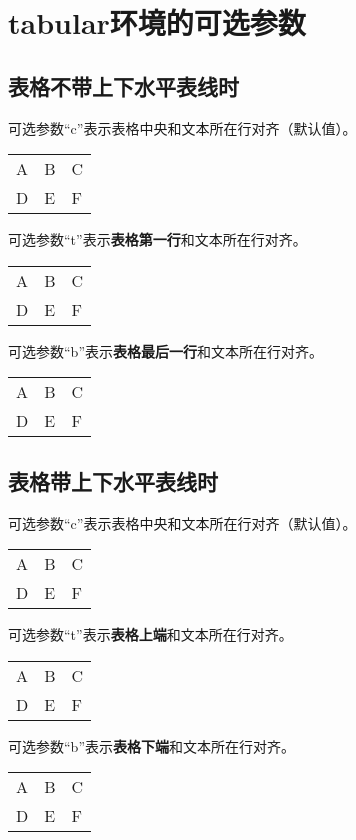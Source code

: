 ﻿\documentclass{article}
\begin{document}
    \mbox{}

\section{tabular环境的可选参数} 
\subsection{表格不带上下水平表线时}
    可选参数``c''表示表格中央和文本所在行对齐（默认值）。
    \begin{tabular}[c]{lll}
        A&B&C\\
        D&E&F\\
    \end{tabular}

    \mbox{}

    可选参数``t''表示\textbf{表格第一行}和文本所在行对齐。
    \begin{tabular}[t]{lll}
        A&B&C\\
        D&E&F\\
    \end{tabular}

    \mbox{}

    可选参数``b''表示\textbf{表格最后一行}和文本所在行对齐。
    \begin{tabular}[b]{lll}
        A&B&C\\
        D&E&F\\
    \end{tabular}
    
\subsection{表格带上下水平表线时}
可选参数``c''表示表格中央和文本所在行对齐（默认值）。
    \begin{tabular}[c]{lll}
        \hline
        A&B&C\\
        D&E&F\\
        \hline
    \end{tabular}

    \mbox{}

    可选参数``t''表示\textbf{表格上端}和文本所在行对齐。
    \begin{tabular}[t]{lll}
        \hline
        A&B&C\\
        D&E&F\\
        \hline
    \end{tabular}

    \mbox{}

    可选参数``b''表示\textbf{表格下端}和文本所在行对齐。
    \begin{tabular}[b]{lll}
        \hline
        A&B&C\\
        D&E&F\\
        \hline
    \end{tabular}
\end{document}
